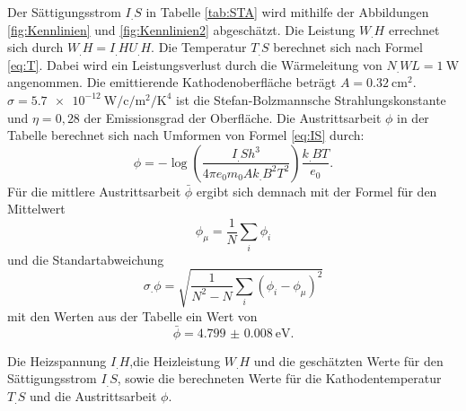 Der Sättigungsstrom $I_.S$ in Tabelle \ref{tab:STA} wird mithilfe der Abbildungen \ref{fig:Kennlinien} und \ref{fig:Kennlinien2} abgeschätzt.
Die Leistung $W_.H$ errechnet sich durch $W_.H = I_.H U_.H$.
Die Temperatur $T_.S$ berechnet sich nach Formel \eqref{eq:T}. Dabei wird ein Leistungsverlust durch die Wärmeleitung von $N_.{WL}=\SI{1}{\watt}$ angenommen. Die emittierende Kathodenoberfläche beträgt $A = \SI{0.32}{\centi\metre\squared}$. $\sigma=\SI{5.7e-12}{\watt\per\centi\per\metre\squared\per\kelvin\tothe{4}}$ ist die Stefan-Bolzmannsche Strahlungskonstante und $\eta=0,28$ der Emissionsgrad der Oberfläche.
Die Austrittsarbeit $\phi$ in der Tabelle berechnet sich nach Umformen von Formel \eqref{eq:IS} durch:
\[
\phi = -\log\left(\frac{I_.Sh^3}{4\pi e_0m_0Ak_.B^2T^2}\right)\frac{k_.BT}{e_0}\text{.}
\]
Für die mittlere Austrittsarbeit $\bar{\phi}$ ergibt sich demnach mit der Formel für den Mittelwert
\[
\phi_\mu = \frac{1}{N}\sum_i\phi_i
\]
und die Standartabweichung
\[
\sigma_.{\phi}=\sqrt{\frac{1}{N^2-N}\sum_i \left(\phi_i-\phi_\mu\right)^2}
\]
mit den Werten aus der Tabelle ein Wert von
\[
\bar{\phi} = \SI{4.799(8)}{\electronvolt}\text{.}
\]

\begin{table}
\centering
\caption{Die Heizspannung $I_.H$,die Heizleistung $W_.H$ und die geschätzten Werte für den Sättigungsstrom $I_.S$, sowie die berechneten Werte für die Kathodentemperatur $T_.S$ und die Austrittsarbeit $\phi$.}

\label{tab:STA}
\end{table}